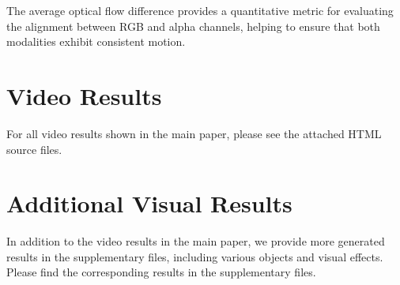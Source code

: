 The average optical flow difference provides a quantitative metric for evaluating the alignment between RGB and alpha channels, helping to ensure that both modalities exhibit consistent motion.

\section{Video Results}
\label{sec:video-results}
For all video results shown in the main paper, please see the attached HTML source files.

\section{Additional Visual Results}
\label{sec:additional-visual-results}
In addition to the video results in the main paper, we provide more generated results in the supplementary files, including various objects and visual effects. Please find the corresponding results in the supplementary files.


